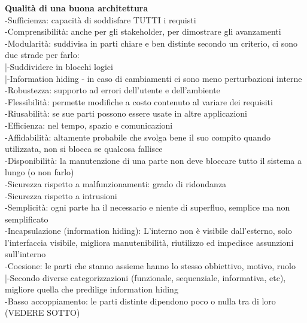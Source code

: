 \documentclass{article}
\begin{document}
		\textbf{Qualità di una buona architettura}\\
		-Sufficienza: capacità di soddisfare TUTTI i requisti\\
		-Comprensibilità: anche per gli stakeholder, per dimostrare gli avanzamenti\\
		-Modularità: suddivisa in parti chiare e ben distinte secondo un criterio, ci sono due strade per farlo:\\
		|-Suddividere in blocchi logici\\
		|-Information hiding - in caso di cambiamenti ci sono meno perturbazioni interne\\
		-Robustezza: supporto ad errori dell'utente e dell'ambiente\\
		-Flessibilità: permette modifiche a costo contenuto al variare dei requisiti\\
		-Riusabilità: se sue parti possono essere usate in altre applicazioni\\
		-Efficienza: nel tempo, spazio e comunicazioni\\
		-Affidabilità: altamente probabile che svolga bene il suo compito quando utilizzata, non si blocca se qualcosa fallisce\\
		-Disponibilità: la manutenzione di una parte non deve bloccare tutto il sistema a lungo (o non farlo)\\
		-Sicurezza rispetto a malfunzionamenti: grado di ridondanza\\
		-Sicurezza rispetto a intrusioni\\
		-Semplicità: ogni parte ha il necessario e niente di superfluo, semplice ma non semplificato\\
		-Incapsulazione (information hiding): L'interno non è visibile dall'esterno, solo l'interfaccia visibile, migliora manutenibilità, riutilizzo ed impedisce assunzioni sull'interno\\
		-Coesione: le parti che stanno assieme hanno lo stesso obbiettivo, motivo, ruolo\\
		|-Secondo diverse categorizzazioni (funzionale, sequenziale, informativa, etc), migliore quella che predilige information hiding\\
		-Basso accoppiamento: le parti distinte dipendono poco o nulla tra di loro (VEDERE SOTTO)\\
		
\end{document}
